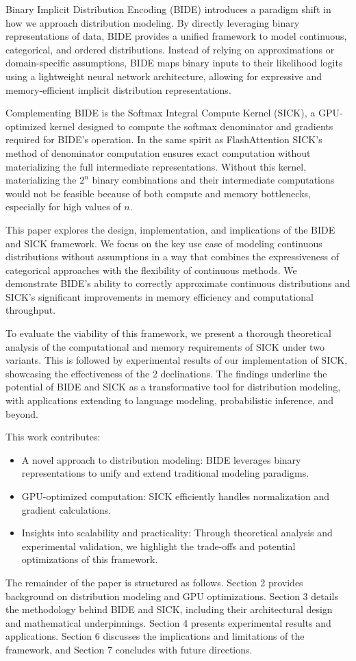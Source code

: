 \documentclass{article}
\begin{document}
Binary Implicit Distribution Encoding (BIDE) introduces a paradigm shift in how we approach distribution modeling. By directly leveraging binary representations of data, BIDE provides a unified framework to model continuous, categorical, and ordered distributions. Instead of relying on approximations or domain-specific assumptions, BIDE maps binary inputs to their likelihood logits using a lightweight neural network architecture, allowing for expressive and memory-efficient implicit distribution representations.

Complementing BIDE is the Softmax Integral Compute Kernel (SICK), a GPU-optimized kernel designed to compute the softmax denominator and gradients required for BIDE's operation. In the same spirit as FlashAttention\cite{dao2022flashattention} SICK’s method of denominator computation ensures exact computation without materializing the full intermediate representations. Without this kernel, materializing the $2^n$ binary combinations and their intermediate computations would not be feasible because of both compute and memory bottlenecks, especially for high values of $n$.

This paper explores the design, implementation, and implications of the BIDE and SICK framework. We focus on the key use case of modeling continuous distributions without assumptions in a way that combines the expressiveness of categorical approaches with the flexibility of continuous methods. We demonstrate BIDE's ability to correctly approximate continuous distributions and SICK's significant improvements in memory efficiency and computational throughput.

To evaluate the viability of this framework, we present a thorough theoretical analysis of the computational and memory requirements of SICK under two variants. This is followed by experimental results of our implementation of SICK, showcasing the effectiveness of the 2 declinations. The findings underline the potential of BIDE and SICK as a transformative tool for distribution modeling, with applications extending to language modeling, probabilistic inference, and beyond.

This work contributes:

\begin{itemize}
\item A novel approach to distribution modeling: BIDE leverages binary representations to unify and extend traditional modeling paradigms.
\item GPU-optimized computation: SICK efficiently handles normalization and gradient calculations.
\item Insights into scalability and practicality: Through theoretical analysis and experimental validation, we highlight the trade-offs and potential optimizations of this framework.
\end{itemize}
The remainder of the paper is structured as follows. Section 2 provides background on distribution modeling and GPU optimizations. Section 3 details the methodology behind BIDE and SICK, including their architectural design and mathematical underpinnings. Section 4 presents experimental results and applications. Section 6 discusses the implications and limitations of the framework, and Section 7 concludes with future directions.
\end{document}
